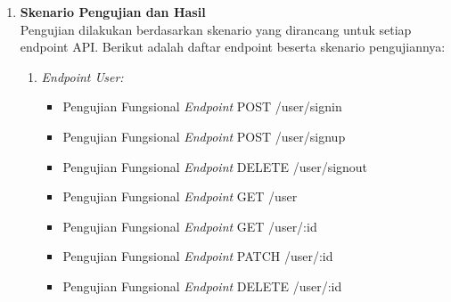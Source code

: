 \begin{enumerate}[label*=\arabic*.,ref=\arabic*]
    \item \textbf{Skenario Pengujian dan Hasil}\\
    Pengujian dilakukan berdasarkan skenario yang dirancang untuk setiap endpoint API. Berikut adalah daftar endpoint beserta skenario pengujiannya:
    \begin{enumerate}[label=\alph*.]
        \item \textit{Endpoint User:} 
            \begin{itemize}
            
                \item Pengujian Fungsional \textit{Endpoint} POST /user/signin
                \vspace{-0.5em}
                
                
                \item Pengujian Fungsional \textit{Endpoint} POST /user/signup
                \vspace{-0.5em}
                
                
                \item Pengujian Fungsional \textit{Endpoint} DELETE /user/signout
                \vspace{-0.5em}
                
                
                \item Pengujian Fungsional \textit{Endpoint} GET /user
                \vspace{-0.5em}
                
                
                \item Pengujian Fungsional \textit{Endpoint} GET /user/:id
                \vspace{-0.5em}
                
                
                \item Pengujian Fungsional \textit{Endpoint} PATCH /user/:id
                \vspace{-0.5em}
                
                
                \item Pengujian Fungsional \textit{Endpoint} DELETE /user/:id
                \vspace{-0.5em}
                
                
            \end{itemize}
    

\end{enumerate}
\end{enumerate}
